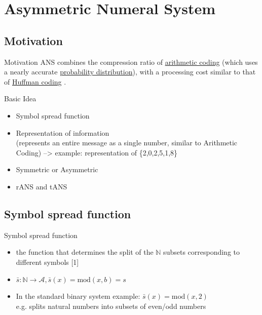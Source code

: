 \section{Asymmetric Numeral System}


\maketableofcontents

\subsection{Motivation}
    \begin{frame}[fragile]{Motivation}
        ANS combines the compression ratio of \href{https://en.wikipedia.org/wiki/Arithmetic_coding}{arithmetic coding} (which uses a nearly accurate \href{https://en.wikipedia.org/wiki/Probability_distribution}{probability distribution}), with a processing cost similar to that of \href{https://en.wikipedia.org/wiki/Huffman_coding}{Huffman coding} .
    \end{frame}

    \begin{frame}[fragile]{Basic Idea}
        \begin{itemize}
            \item<1-> Symbol spread function
            \item<2-> Representation of information \\
            (represents an entire message as a single number, similar to Arithmetic Coding) --> example: representation of \{2,0,2,5,1,8\}
            \item<3-> Symmetric or Asymmetric
            \item<4-> rANS and tANS
        \end{itemize}
    \end{frame}

\subsection{Symbol spread function}
    \begin{frame}[fragile]{Symbol spread function}
        \begin{itemize}
            \item<1-> the function that determines the split of the $\mathbb{N}$ subsets corresponding to different symbols [1]
            \item<2-> $\bar{s}: \mathbb{N} \rightarrow \mathcal{A}, \bar{s}(x) = \text{mod}(x,b) = s$
            \item<3-> In the standard binary system example: $\bar{s}(x) = \text{mod}(x,2)$ \\ e.g. splits natural numbers into subsets of even/odd numbers 
        \end{itemize}
    \end{frame}


